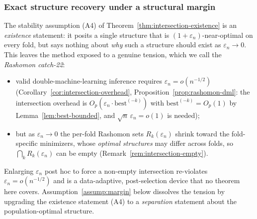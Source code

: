 
\subsubsection{Exact structure recovery under a structural margin}
\label{app:margin}

The stability assumption (A4) of Theorem~\ref{thm:intersection-existence} is an
\emph{existence} statement: it posits a single structure that is
$(1+\varepsilon_n)$-near-optimal on every fold, but says nothing about
\emph{why} such a structure should exist as $\varepsilon_n\to 0$. This leaves
the method exposed to a genuine tension, which we call the \emph{Rashomon
catch-22}:
\begin{itemize}
\item valid double-machine-learning inference requires
  $\varepsilon_n = o(n^{-1/2})$ (Corollary~\ref{cor:intersection-overhead},
  Proposition~\ref{prop:rashomon-dml}: the intersection overhead is
  $O_p(\varepsilon_n\cdot\text{best}^{(-k)})$ with $\text{best}^{(-k)}=O_p(1)$
  by Lemma~\ref{lem:best-bounded}, and $\sqrt n\,\varepsilon_n = o(1)$ is
  needed);
\item but as $\varepsilon_n\to 0$ the per-fold Rashomon sets
  $R_k(\varepsilon_n)$ shrink toward the fold-specific minimizers, whose
  \emph{optimal structures} may differ across folds, so
  $\bigcap_{k}R_k(\varepsilon_n)$ can be empty
  (Remark~\ref{rem:intersection-empty}).
\end{itemize}
Enlarging $\varepsilon_n$ post hoc to force a non-empty intersection re-violates
$\varepsilon_n = o(n^{-1/2})$ and is a data-adaptive, post-selection device that
no theorem here covers. Assumption~\ref{assump:margin} below dissolves the
tension by upgrading the existence statement (A4) to a \emph{separation}
statement about the population-optimal structure.

